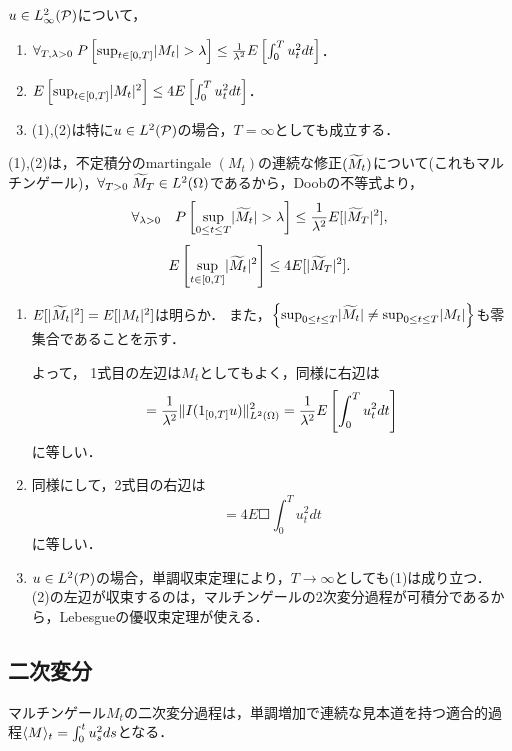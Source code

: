 \documentclass[uplatex,dvipdfmx]{jsreport}
\begin{document}
\begin{corollary}[最大不等式]
    $u\in L_\infty^2(\P)$について，
    \begin{enumerate}
        \item $\forall_{T,\lambda>0}\;P\Square{\sup_{t\in[0,T]}\abs{M_t}>\lambda}\le\frac{1}{\lambda^2}E\Square{\int^T_0u^2_tdt}$．
        \item $E\Square{\sup_{t\in[0,T]}\abs{M_t}^2}\le 4E\Square{\int^T_0u^2_tdt}$．
        \item (1),(2)は特に$u\in L^2(\P)$の場合，$T=\infty$としても成立する．
    \end{enumerate}
\end{corollary}
\begin{Proof}
    (1),(2)は，不定積分のmartingale $(M_t)$の連続な修正$(\wt{M}_t)$について(これもマルチンゲール)，$\forall_{T>0}\;\wt{M}_T\in L^2(\Om)$であるから，Doobの不等式より，
    \[\forall_{\lambda>0}\quad P\Square{\sup_{0\le t\le T}\abs{\wt{M}_t}>\lambda}\le\frac{1}{\lambda^2}E[\abs{\wt{M}_T}^2],\]
    \[E\Square{\sup_{t\in[0,T]}\abs{\wt{M}_t}^2}\le 4E[\abs{\wt{M}_T}^2].\]
    \begin{enumerate}
        \item $E[\abs{\wt{M}_t}^2]=E[\abs{M_t}^2]$は明らか．
        また，$\Brace{\sup_{0\le t\le T}\abs{\wt{M} _t}\ne\sup_{0\le t\le T}\abs{M_t}}$も零集合であることを示す．
        
        よって，
        1式目の左辺は$M_t$としてもよく，同様に右辺は
        \[=\frac{1}{\lambda^2}\norm{I(1_{[0,T]}u)}_{L^2(\Om)}^2=\frac{1}{\lambda^2}E\Square{\int^T_0u_t^2dt}\]
        に等しい．
        \item 同様にして，2式目の右辺は
        \[=4E\Square{\int^T_0u_t^2dt}\]
        に等しい．
        \item $u\in L^2(\P)$の場合，単調収束定理により，$T\to\infty$としても(1)は成り立つ．
        (2)の左辺が収束するのは，マルチンゲールの2次変分過程が可積分であるから，Lebesgueの優収束定理が使える．
    \end{enumerate}
\end{Proof}

\subsection{二次変分}

\begin{tcolorbox}[colframe=ForestGreen, colback=ForestGreen!10!white,breakable,colbacktitle=ForestGreen!40!white,coltitle=black,fonttitle=\bfseries\sffamily,
title=]
    マルチンゲール$M_t$の二次変分過程は，単調増加で連続な見本道を持つ適合的過程$\brac{M}_t=\int^t_0u_s^2ds$となる．
\end{tcolorbox}
\end{document}
